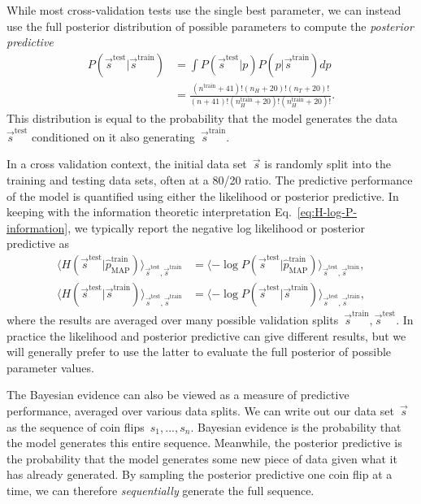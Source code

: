 While most cross-validation tests use the single best parameter, we can instead use the full posterior distribution of possible parameters to compute the \emph{posterior predictive} \begin{align}
    P(\vec{s}^{\text{test}}|\vec{s}^{\text{train}}) &= \int P(\vec{s}^{\text{test}}|p)P(p|\vec{s}^{\text{train}}) dp \nonumber \\
    &= \frac{(n^{\text{train}} + 41)!(n_H + 20)!(n_T + 20)!}{(n + 41)!(n_H^{\text{train}} + 20)!(n_H^{\text{train}} + 20)!}.
\end{align}
This distribution is equal to the probability that the model generates the data~$\vec{s}^{\text{test}}$ conditioned on it also generating~$\vec{s}^{\text{train}}$.  

In a cross validation context, the initial data set~$\vec{s}$ is randomly split into the training and testing data sets, often at a 80/20 ratio. The predictive performance of the model is quantified using either the likelihood or posterior predictive. In keeping with the information theoretic interpretation Eq.~\eqref{eq:H-log-P-information}, we typically report the negative log likelihood or posterior predictive as \begin{align}
    \langle H(\vec{s}^{\text{test}}|\hat{p}_{\text{MAP}}^{\text{train}})\rangle_{\vec{s}^{\text{test}},\vec{s}^{\text{train}}} &= \langle -\log P(\vec{s}^{\text{test}}|\hat{p}_{\text{MAP}}^{\text{train}})\rangle_{\vec{s}^{\text{test}},\vec{s}^{\text{train}}},
    \nonumber \\
    \langle H(\vec{s}^{\text{test}}|\vec{s}^{\text{train}})\rangle_{\vec{s}^{\text{test}},\vec{s}^{\text{train}}} &= \langle -\log P(\vec{s}^{\text{test}}|\vec{s}^{\text{train}})\rangle_{\vec{s}^{\text{test}},\vec{s}^{\text{train}}}, \label{eq:log-posterior-predictive-cross-validation}
\end{align}
where the results are averaged over many possible validation splits~$\vec{s}^{\text{train}},\vec{s}^{\text{test}}$. In practice the likelihood and posterior predictive can give different results, but we will generally prefer to use the latter to evaluate the full posterior of possible parameter values. 

The Bayesian evidence can also be viewed as a measure of predictive performance, averaged over various data splits. We can write out our data set~$\vec{s}$ as the sequence of coin flips~$s_1,...,s_n$. Bayesian evidence is the probability that the model generates this entire sequence. Meanwhile, the posterior predictive is the probability that the model generates some new piece of data given what it has already generated. By sampling the posterior predictive one coin flip at a time, we can therefore \emph{sequentially} generate the full sequence. 

